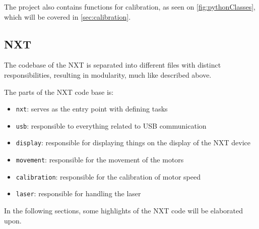 The project also contains functions for calibration, as seen on \autoref{fig:pythonClasses}, which will be covered in \autoref{sec:calibration}.


\subsection{NXT}
The codebase of the NXT is separated into different files with distinct responsibilities, resulting in modularity, much like described above.

The parts of the NXT code base is:
\begin{itemize}
	\item \texttt{nxt}: serves as the entry point with defining tasks
	\item \texttt{usb}: responsible to everything related to USB communication
	\item \texttt{display}: responsible for displaying things on the display of the NXT device
	\item \texttt{movement}: responsible for the movement of the motors
	\item \texttt{calibration}: responsible for the calibration of motor speed
	\item \texttt{laser}: responsible for handling the laser
\end{itemize}

In the following sections, some highlights of the NXT code will be elaborated upon.